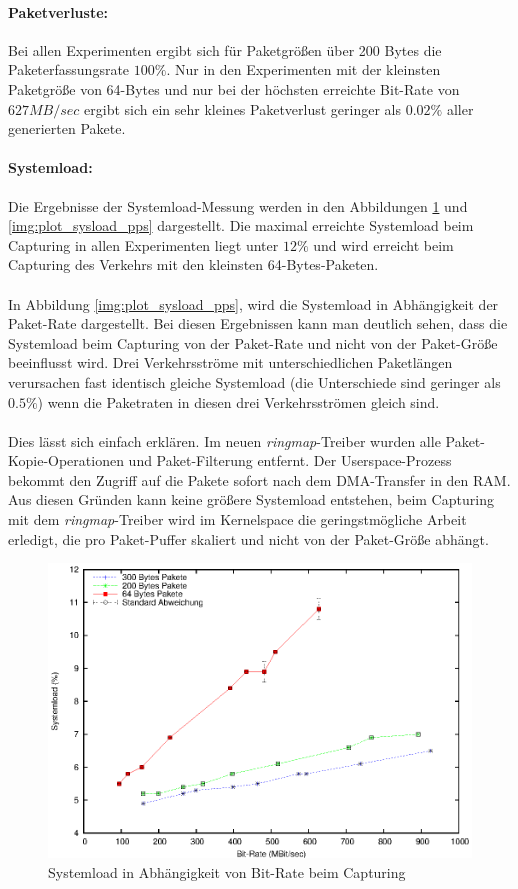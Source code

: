 \paragraph*{Paketverluste:} Bei allen Experimenten ergibt sich für Paketgrößen
über 200 Bytes die Paketerfassungsrate $100\%$. Nur in den Experimenten mit der
kleinsten Paketgröße von 64-Bytes und nur bei der höchsten erreichte Bit-Rate
von $627 MB/sec$ ergibt sich ein sehr kleines Paketverlust geringer als
$0.02\%$ aller generierten Pakete.

\paragraph*{Systemload:}
Die Ergebnisse der Systemload-Messung werden in den Abbildungen
\ref{img:plot_sysload_mbs} und \ref{img:plot_sysload_pps} dargestellt. Die
maximal erreichte Systemload beim Capturing in allen Experimenten liegt unter
$12\%$ und wird erreicht beim Capturing des Verkehrs mit den kleinsten
64-Bytes-Paketen.\\\\
In Abbildung \ref{img:plot_sysload_pps}, wird die Systemload in Abhängigkeit
der Paket-Rate dargestellt. Bei diesen Ergebnissen kann man deutlich sehen,
dass die Systemload beim Capturing von der Paket-Rate und nicht von der
Paket-Größe beeinflusst wird. Drei Verkehrsströme mit unterschiedlichen
Paketlängen verursachen fast identisch gleiche Systemload (die Unterschiede
sind geringer als $0.5\%$) wenn die Paketraten in diesen drei Verkehrsströmen
gleich sind.\\\\
Dies lässt sich einfach erklären. Im neuen \emph{ringmap}-Treiber wurden alle
Paket-Kopie-Operationen und Paket-Filterung entfernt. Der Userspace-Prozess
bekommt den Zugriff auf die Pakete sofort nach dem DMA-Transfer in den RAM. Aus
diesen Gründen kann keine größere Systemload entstehen, beim Capturing mit dem
\emph{ringmap}-Treiber wird im Kernelspace die geringstmögliche Arbeit erledigt,
die pro Paket-Puffer skaliert und nicht von der Paket-Größe abhängt.
%
\begin{figure} 
\centering \includegraphics[width=5.5in]{plots/graphs/sysload_single_CPU_pcie_mbs}
\caption{Systemload in Abhängigkeit von Bit-Rate beim Capturing}
\label{img:plot_sysload_mbs}
\end{figure}
